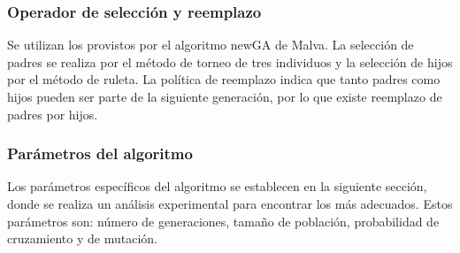 \subsubsection{Operador de selección y reemplazo}
Se  utilizan los provistos por el algoritmo newGA de Malva. La selección de padres se realiza por el método de torneo de tres individuos y la selección de hijos por el método de ruleta. La política de reemplazo indica que tanto padres como hijos pueden ser parte de la siguiente generación, por lo que existe reemplazo de padres por hijos.

\subsubsection{Parámetros del algoritmo}
Los parámetros específicos del algoritmo se establecen en la siguiente sección, donde se realiza un análisis experimental para encontrar los más adecuados. Estos parámetros son: número de generaciones, tamaño de población, probabilidad de cruzamiento y de mutación.